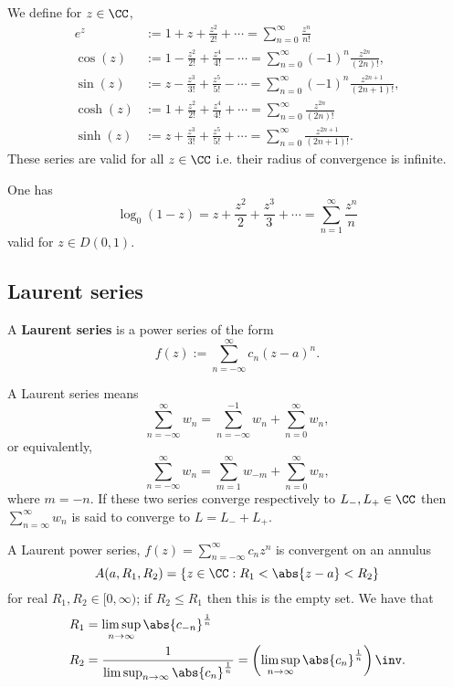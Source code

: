 \documentclass[12pt, a4paper]{article}
\begin{document}
\begin{definition}
    We define for \(z \in \CC\),
    \[\begin{aligned}
        e^z &:= 1+z+\frac{z^2}{2!} + \cdots = \sum_{n=0}^{\infty} \frac{z^n}{n!} \\
        \cos(z) &:= 1 -\frac{z^2}{2!}+\frac{z^4}{4!} - \cdots = \sum_{n=0}^{\infty} (-1)^n \frac{z^{2n}}{(2n)!}, \\
        \sin(z) &:= z-\frac{z^3}{3!}+\frac{z^5}{5!}- \cdots = \sum_{n=0}^{\infty} (-1)^n \frac{z^{2n+1}}{(2n+1)!}, \\
        \cosh(z) &:= 1+\frac{z^2}{2!}+\frac{z^4}{4!}+ \cdots = \sum_{n=0}^{\infty} \frac{z^{2n}}{(2n)!}\\
        \sinh(z) &:= z+\frac{z^3}{3!}+\frac{z^5}{5!} + \cdots = \sum_{n=0}^{\infty} \frac{z^{2n+1}}{(2n+1)!}.
    \end{aligned}\]
    These series are valid for all \(z \in \CC\) i.e. their radius of convergence is infinite.
\end{definition}

\begin{proposition}
    One has 
    \[\log_0(1-z) = z+\frac{z^2}{2}+\frac{z^3}{3}+ \cdots = \sum_{n=1}^{\infty} \frac{z^n}{n}\]
    valid for \(z \in D(0,1)\).
\end{proposition}

\subsection{Laurent series}

\begin{definition}
    A \textbf{Laurent series} is a power series of the form 
    \[f(z) := \sum_{n=-\infty}^{\infty} c_n(z-a)^n.\]
\end{definition}

\begin{theorem}
    A Laurent series means 
    \[\sum_{n=-\infty}^{\infty} w_n = \sum_{n=-\infty}^{-1} w_n +\sum_{n=0}^{\infty} w_n,\]
    or equivalently,
    \[\sum_{n=-\infty}^{\infty} w_n = \sum_{m=1}^{\infty} w_{-m} +\sum_{n=0}^{\infty} w_n,\]
    where \(m=-n\).
    If these two series converge respectively to \(L_-,L_+ \in \CC\) then \(\sum_{n=\infty}^{\infty} w_n\) is said to converge to \(L = L_-+L_+\).
\end{theorem}

\begin{mdthm}
    A Laurent power series, \(f(z) = \sum_{n=-\infty}^{\infty} c_n z^n\) is convergent on an annulus 
    \[A(a,R_1,R_2) = \{z \in \CC : R_1 < \abs{z-a} < R_2\}\]
    for real \(R_1,R_2 \in [0,\infty)\); if \(R_2 \leq R_1\) then this is the empty set. We have that 
    \[\begin{aligned}
        R_1 &= \limsup_{n \to \infty} \abs{c_{-n}}^{\frac{1}{n}} \\
        R_2 &= \frac{1}{\limsup_{n \to \infty} \abs{c_n}^{\frac{1}{n}}} = \left( \limsup_{n \to \infty} \abs{c_n}^{\frac{1}{n}} \right)\inv.
    \end{aligned}\]
\end{mdthm}
\end{document}
